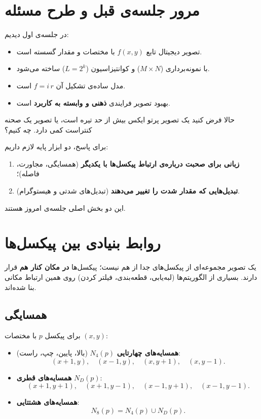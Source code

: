 \documentclass[11pt,a4paper]{article}
\begin{document}
	
	\section{مرور جلسه‌ی قبل و طرح مسئله}
	
	در جلسه‌ی اول دیدیم:
	
	\begin{itemize}
		\item تصویر دیجیتال تابع $f(x,y)$ با مختصات و مقدار گسسته است.
		\item با نمونه‌برداری ($M\times N$) و کوانتیزاسیون ($L=2^k$) ساخته می‌شود.
		\item مدل ساده‌ی تشکیل آن $f=i\,r$ است.
		\item بهبود تصویر فرایندی \textbf{ذهنی و وابسته به کاربرد} است.
	\end{itemize}
	
	حالا فرض کنید یک تصویر پرتو ایکس بیش از حد تیره است، یا تصویر یک صحنه کنتراست کمی دارد.
	چه کنیم؟
	
	برای پاسخ، دو ابزار پایه لازم داریم:
	
	\begin{enumerate}
		\item \textbf{زبانی برای صحبت درباره‌ی ارتباط پیکسل‌ها با یکدیگر} (همسایگی، مجاورت، فاصله)؛
		\item \textbf{تبدیل‌هایی که مقدار شدت را تغییر می‌دهند} (تبدیل‌های شدتی و هیستوگرام).
	\end{enumerate}
	
	این دو بخش اصلی جلسه‌ی امروز هستند.
	
	
	\section{روابط بنیادی بین پیکسل‌ها}
	
	یک تصویر مجموعه‌ای از پیکسل‌های جدا از هم نیست؛ پیکسل‌ها \textbf{در مکان کنار هم} قرار دارند.
	بسیاری از الگوریتم‌ها (لبه‌یابی، قطعه‌بندی، فیلتر کردن) روی همین ارتباط مکانی بنا شده‌اند.
	
	\subsection{همسایگی}
	
	برای پیکسل $p$ با مختصات $(x,y)$:
	
	\begin{itemize}
		\item \textbf{همسایه‌های چهارتایی} $N_4(p)$ (بالا، پایین، چپ، راست):
		\[
		(x+1,y),\quad(x-1,y),\quad(x,y+1),\quad(x,y-1).
		\]
		\item \textbf{همسایه‌های قطری} $N_D(p)$:
		\[
		(x+1,y+1),\quad(x+1,y-1),\quad(x-1,y+1),\quad(x-1,y-1).
		\]
		\item \textbf{همسایه‌های هشتتایی}:
		\[
		N_8(p)=N_4(p)\cup N_D(p).
		\]
	\end{itemize}
	
\end{document}
